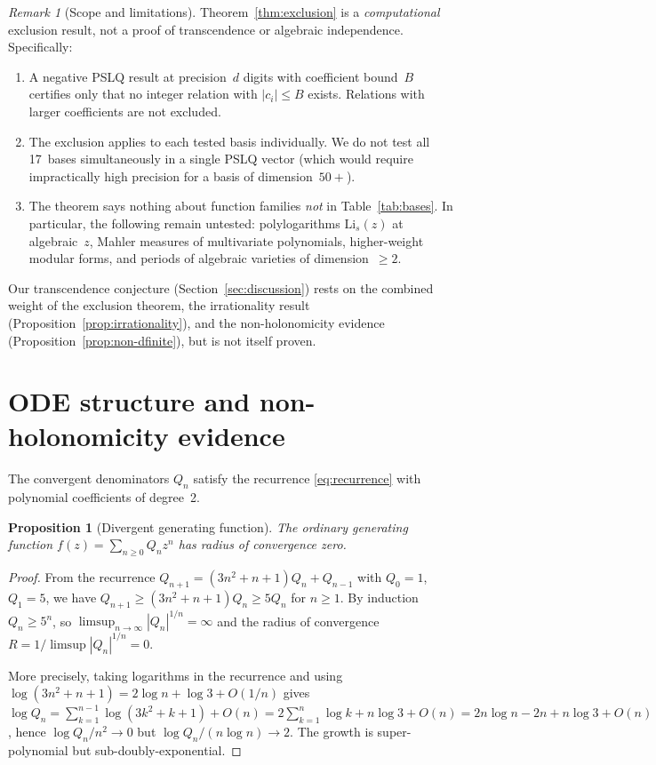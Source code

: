 \documentclass[11pt,a4paper]{article}
\newtheorem{proposition}[theorem]{Proposition}
\theoremstyle{definition}
\theoremstyle{remark}
\newtheorem{remark}[theorem]{Remark}
\newcommand{\abs}[1]{\lvert #1 \rvert}
\begin{document}
\begin{remark}[Scope and limitations]\label{rem:scope}
Theorem~\ref{thm:exclusion} is a \emph{computational} exclusion
result, not a proof of transcendence or algebraic independence.
Specifically:
\begin{enumerate}
\item A negative PSLQ result at precision~$d$ digits with
  coefficient bound~$B$ certifies only that no integer relation
  with $\abs{c_i} \le B$ exists.  Relations with larger coefficients
  are not excluded.
\item The exclusion applies to each tested basis individually.
  We do not test all 17~bases simultaneously in a single PSLQ
  vector (which would require impractically high precision for
  a basis of dimension~$50+$).
\item The theorem says nothing about function families \emph{not}
  in Table~\ref{tab:bases}.  In particular, the following remain
  untested: polylogarithms $\mathrm{Li}_s(z)$ at algebraic~$z$,
  Mahler measures of multivariate polynomials, higher-weight modular
  forms, and periods of algebraic varieties of dimension~$\ge 2$.
\end{enumerate}
Our transcendence conjecture (Section~\ref{sec:discussion}) rests
on the combined weight of the exclusion theorem, the irrationality
result (Proposition~\ref{prop:irrationality}), and the non-holonomicity
evidence (Proposition~\ref{prop:non-dfinite}), but is not itself
proven.
\end{remark}


\section{ODE structure and non-holonomicity evidence}\label{sec:ode}

The convergent denominators $Q_n$ satisfy the recurrence
\eqref{eq:recurrence} with polynomial coefficients of degree~2.

\begin{proposition}[Divergent generating function]\label{prop:gf-diverge}
The ordinary generating function
$f(z) = \sum_{n \ge 0} Q_n z^n$
has radius of convergence zero.
\end{proposition}

\begin{proof}
From the recurrence $Q_{n+1} = (3n^2+n+1) Q_n + Q_{n-1}$ with
$Q_0 = 1$, $Q_1 = 5$, we have $Q_{n+1} \geq (3n^2+n+1) Q_n
\geq 5 Q_n$ for $n \geq 1$.  By induction $Q_n \geq 5^n$, so
$\limsup_{n \to \infty} |Q_n|^{1/n} = \infty$ and the radius
of convergence $R = 1/\limsup |Q_n|^{1/n} = 0$.

More precisely, taking logarithms in the recurrence and using
$\log(3n^2+n+1) = 2\log n + \log 3 + O(1/n)$ gives
$\log Q_n = \sum_{k=1}^{n-1} \log(3k^2+k+1) + O(n)
= 2 \sum_{k=1}^{n} \log k + n \log 3 + O(n)
= 2n \log n - 2n + n\log 3 + O(n)$,
hence $\log Q_n / n^2 \to 0$ but $\log Q_n / (n \log n) \to 2$.
The growth is super-polynomial but sub-doubly-exponential.
\end{proof}
\end{document}
